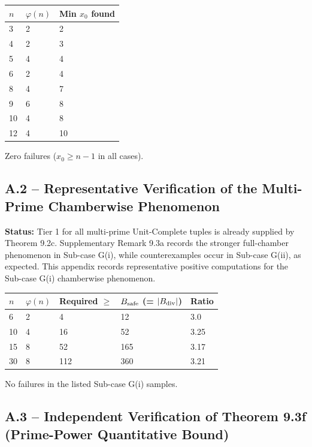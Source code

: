 \documentclass[11pt,a4paper]{article}
\theoremstyle{plain}
\theoremstyle{definition}
\theoremstyle{remark}
\begin{document}
\begin{center}\begin{tabular}{lll}
\toprule
$n$ & $\varphi(n)$ & Min $x_0$ found \\
\midrule
3 & 2 & 2 \\
4 & 2 & 3 \\
5 & 4 & 4 \\
6 & 2 & 4 \\
8 & 4 & 7 \\
9 & 6 & 8 \\
10 & 4 & 8 \\
12 & 4 & 10 \\
\bottomrule
\end{tabular}\end{center}


Zero failures ($x_0 \geq n-1$ in all cases).


\subsection{A.2 -- Representative Verification of the Multi-Prime Chamberwise Phenomenon}


\textbf{Status:} Tier 1 for all multi-prime Unit-Complete tuples is already supplied by Theorem 9.2c. Supplementary Remark 9.3a records the stronger full-chamber phenomenon in Sub-case G(i), while counterexamples occur in Sub-case G(ii), as expected. This appendix records representative positive computations for the Sub-case G(i) chamberwise phenomenon.


\begin{center}\begin{tabular}{lllll}
\toprule
$n$ & $\varphi(n)$ & Required $\geq$ & $B_{\rm safe}$ (= $|B_{\rm div}|$) & Ratio \\
\midrule
6 & 2 & 4 & 12 & 3.0 \\
10 & 4 & 16 & 52 & 3.25 \\
15 & 8 & 52 & 165 & 3.17 \\
30 & 8 & 112 & 360 & 3.21 \\
\bottomrule
\end{tabular}\end{center}


No failures in the listed Sub-case G(i) samples.


\subsection{A.3 -- Independent Verification of Theorem 9.3f (Prime-Power Quantitative Bound)}
\end{document}
